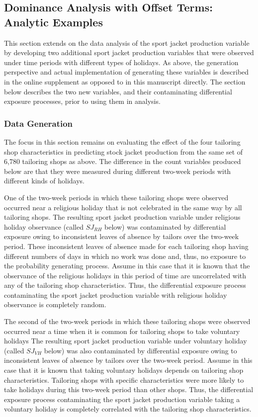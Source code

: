 \documentclass[ShortAfour,times,sageapa]{sagej}
\begin{document}
	\subsection{Dominance Analysis with Offset Terms: Analytic Examples}
	
	This section extends on the data analysis of the sport jacket production variable by developing two additional sport jacket production variables that were observed under time periods with different types of holidays.	
	As above, the generation perspective and actual implementation of generating these variables is described in the online supplement as opposed to in this manuscript directly. The section below describes the two new variables, and their contaminating differential exposure processes, prior to using them in analysis.
	
		\subsubsection{Data Generation}
		
	The focus in this section remains on evaluating the effect of the four tailoring shop characteristics in predicting stock jacket production from the same set of 6,780 tailoring shops as above. 
	The difference in the count variables produced below are that they were measured during different two-week periods with different kinds of holidays.
	
	One of the two-week periods in which these tailoring shops were observed occurred near a religious holiday that is not celebrated in the same way by all tailoring shops.
	The resulting sport jacket production variable under religious holiday observance (called $SJ_{RH}$ below) was contaminated by differential exposure owing to inconsistent leaves of absence by tailors over the two-week period.
	These inconsistent leaves of absence made for each tailoring shop having different numbers of days in which no work was done and, thus, no exposure to the probability generating process.
	Assume in this case that it is known that the observance of the religious holidays in this period of time are uncorrelated with any of the tailoring shop characteristics. 
	Thus, the differential exposure process contaminating the sport jacket production variable with religious holiday observance is completely random.
	
	The second of the two-week periods in which these tailoring shops were observed occurred near a time when it is common for tailoring shops to take voluntary holidays
	The resulting sport jacket production variable under voluntary holiday (called $SJ_{VH}$ below) was also contaminated by differential exposure owing to inconsistent leaves of absence by tailors over the two-week period.
	Assume in this case that it is known that taking voluntary holidays depends on tailoring shop characteristics.
	Tailoring shops with specific characteristics were more likely to take holidays during this two-week period than other shops.
	Thus, the differential exposure process contaminating the sport jacket production variable taking a voluntary holiday is completely correlated with the tailoring shop characteristics.
	
\end{document}

